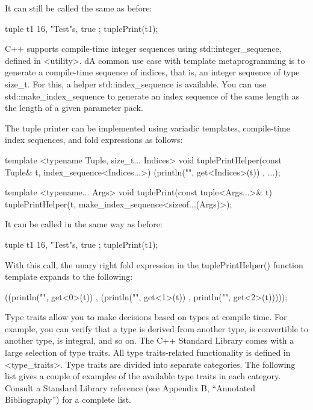 It can still be called the same as before:

\begin{cpp}
tuple t1 { 16, "Test"s, true };
tuplePrint(t1);
\end{cpp}


C++ supports compile-time integer sequences using std::integer\_sequence, defined in <utility>. dA common use case with template metaprogramming is to generate a compile-time sequence of indices, that is, an integer sequence of type size\_t. For this, a helper std::index\_sequence is available. You can use std::make\_index\_sequence to generate an index sequence of the same length as the length of a given parameter pack.

The tuple printer can be implemented using variadic templates, compile-time index sequences, and fold expressions as follows:

\begin{cpp}
template <typename Tuple, size_t... Indices>
void tuplePrintHelper(const Tuple& t, index_sequence<Indices...>)
{
    (println("{}", get<Indices>(t)) , ...);
}

template <typename... Args>
void tuplePrint(const tuple<Args...>& t)
{
    tuplePrintHelper(t, make_index_sequence<sizeof...(Args)>{});
}
\end{cpp}

It can be called in the same way as before:

\begin{cpp}
tuple t1 { 16, "Test"s, true };
tuplePrint(t1);
\end{cpp}

With this call, the unary right fold expression in the tuplePrintHelper() function template expands to the following:

\begin{cpp}
((println("{}", get<0>(t)) ,
 (println("{}", get<1>(t)) ,
  println("{}", get<2>(t)))));
\end{cpp}



Type traits allow you to make decisions based on types at compile time. For example, you can verify that a type is derived from another type, is convertible to another type, is integral, and so on. The C++ Standard Library comes with a large selection of type traits. All type traits-related functionality is defined in <type\_traits>. Type traits are divided into separate categories. The following list gives a couple of examples of the available type traits in each category. Consult a Standard Library reference (see Appendix B, “Annotated Bibliography”) for a complete list.

